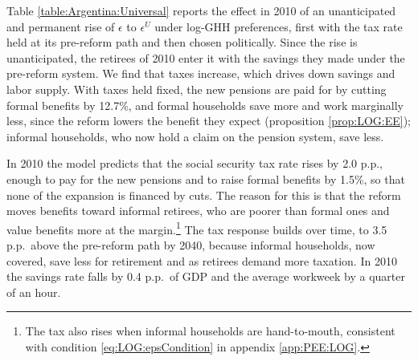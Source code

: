 

Table \ref{table:Argentina:Universal} reports the effect in 2010 of an unanticipated and permanent rise of $\epsilon$ to $\epsilon^U$ under log-GHH preferences, first with the tax rate held at its pre-reform path and then chosen politically. Since the rise is unanticipated, the retirees of 2010 enter it with the savings they made under the pre-reform system. We find that taxes increase, which drives down savings and labor supply. With taxes held fixed, the new pensions are paid for by cutting formal benefits by 12.7\%, and formal households save more and work marginally less, since the reform lowers the benefit they expect (proposition \ref{prop:LOG:EE}); informal households, who now hold a claim on the pension system, save less.



In 2010 the model predicts that the social security tax rate rises by 2.0 p.p., enough to pay for the new pensions and to raise formal benefits by 1.5\%, so that none of the expansion is financed by cuts. The reason for this is that the reform moves benefits toward informal retirees, who are poorer than formal ones and value benefits more at the margin.\footnote{The tax also rises when informal households are hand-to-mouth, consistent with condition \eqref{eq:LOG:epsCondition} in appendix \ref{app:PEE:LOG}.} The tax response builds over time, to 3.5 p.p.\ above the pre-reform path by 2040, because informal households, now covered, save less for retirement and as retirees demand more taxation. In 2010 the savings rate falls by 0.4 p.p.\ of GDP and the average workweek by a quarter of an hour.

